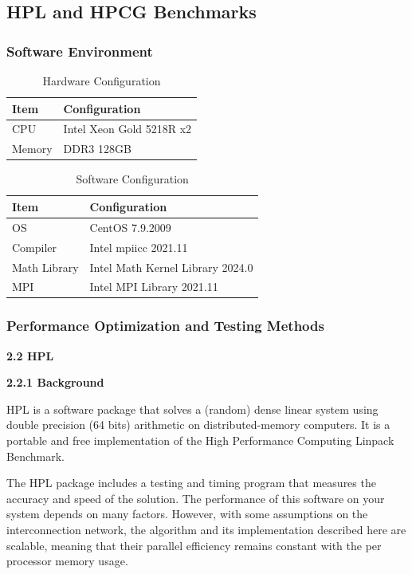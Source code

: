 \documentclass[a4paper,12pt]{article}
\begin{document}
\subsection{HPL and HPCG Benchmarks}

\subsubsection{Software Environment}

\begin{table}[H]
\centering
\caption{Hardware Configuration}
\vspace{0.5cm}
\begin{tabular}{|l|l|}
\toprule
Item & Configuration \\
\midrule
CPU & Intel Xeon Gold 5218R x2 \\
\hline
Memory & DDR3 128GB \\
\bottomrule
\end{tabular}
\end{table}

\begin{table}[H]
\centering
\caption{Software Configuration}
\vspace{0.5cm}
\begin{tabular}{|l|l|}
\toprule
Item & Configuration \\
\midrule
OS & CentOS 7.9.2009 \\
\hline
Compiler & Intel mpiicc 2021.11 \\
\hline
Math Library & Intel Math Kernel Library 2024.0 \\
\hline
MPI & Intel MPI Library 2021.11 \\
\bottomrule
\end{tabular}
\end{table}


\subsubsection{Performance Optimization and Testing Methods}

\textbf{2.2 HPL}

\textbf{2.2.1 Background}

HPL is a software package that solves a (random) dense linear system using double precision (64 bits) arithmetic on distributed-memory computers. It is a portable and free implementation of the High Performance Computing Linpack Benchmark.

The HPL package includes a testing and timing program that measures the accuracy and speed of the solution. The performance of this software on your system depends on many factors. However, with some assumptions on the interconnection network, the algorithm and its implementation described here are scalable, meaning that their parallel efficiency remains constant with the per processor memory usage.
\end{document}
